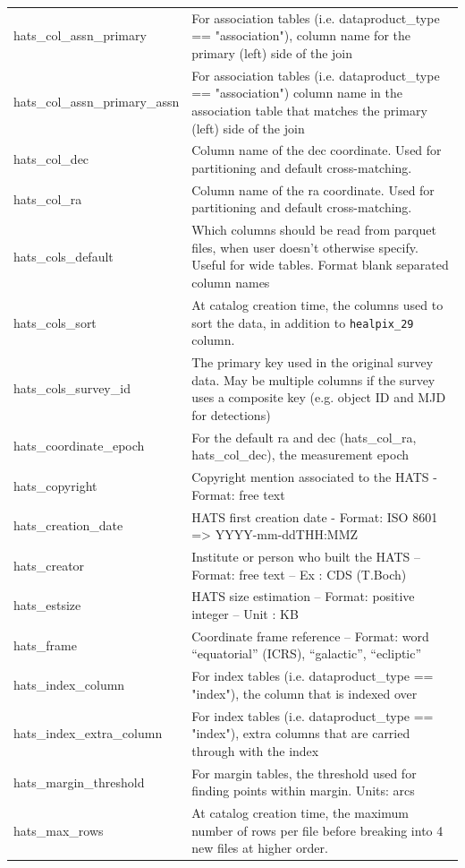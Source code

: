 \documentclass[11pt,a4paper]{ivoa}
\begin{document}
\begin{longtable}[h!]{D{0.33\textwidth} D{0.67\textwidth}}
hats\_col\_assn\_primary &For association tables (i.e. dataproduct\_type == "association"), column name for the primary (left) side of the join \\
hats\_col\_assn\_primary\_assn &For association tables (i.e. dataproduct\_type == "association") column name in the association table that matches the primary (left) side of the join \\
hats\_col\_dec &Column name of the dec coordinate. Used for partitioning and default cross-matching. \\
hats\_col\_ra &Column name of the ra coordinate. Used for partitioning and default cross-matching. \\
hats\_cols\_default &Which columns should be read from parquet files, when user doesn't otherwise specify. Useful for wide tables. Format blank separated column names \\
hats\_cols\_sort &At catalog creation time, the columns used to sort the data, in addition to \texttt{healpix\_29} column. \\
hats\_cols\_survey\_id &The primary key used in the original survey data. May be multiple columns if the survey uses a composite key (e.g. object ID and MJD for detections) \\
hats\_coordinate\_epoch &For the default ra and dec (hats\_col\_ra, hats\_col\_dec), the measurement epoch \\
hats\_copyright &Copyright mention associated to the HATS - Format: free text \\
hats\_creation\_date &HATS first creation date - Format: ISO 8601 => YYYY-mm-ddTHH:MMZ \\
hats\_creator &Institute or person who built the HATS – Format: free text – Ex : CDS (T.Boch) \\
hats\_estsize &HATS size estimation – Format: positive integer – Unit : KB \\
hats\_frame &Coordinate frame reference – Format: word “equatorial” (ICRS), “galactic”, “ecliptic” \\
hats\_index\_column &For index tables (i.e. dataproduct\_type == "index"), the column that is indexed over \\
hats\_index\_extra\_column &For index tables (i.e. dataproduct\_type == "index"), extra columns that are carried through with the index \\
hats\_margin\_threshold &For margin tables, the threshold used for finding points within margin. Units: arcs \\
hats\_max\_rows &At catalog creation time, the maximum number of rows per file before breaking into 4 new files at higher order. \\

\end{longtable}
\end{document}
